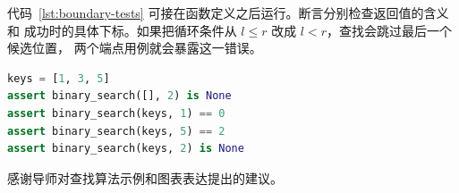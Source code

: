 \documentclass{fduthesis}
\begin{document}
代码~\ref{lst:boundary-tests} 可接在函数定义之后运行。断言分别检查返回值的含义和
成功时的具体下标。如果把循环条件从 $l\le r$ 改成 $l<r$，查找会跳过最后一个候选位置，
两个端点用例就会暴露这一错误。

\begin{lstlisting}[language=Python,caption={边界输入的断言检查},label={lst:boundary-tests}]
keys = [1, 3, 5]
assert binary_search([], 2) is None
assert binary_search(keys, 1) == 0
assert binary_search(keys, 5) == 2
assert binary_search(keys, 2) is None
\end{lstlisting}

\backmatter

\begin{acknowledgements}
感谢导师对查找算法示例和图表表达提出的建议。
\end{acknowledgements}

\makeauthorization
\end{document}
